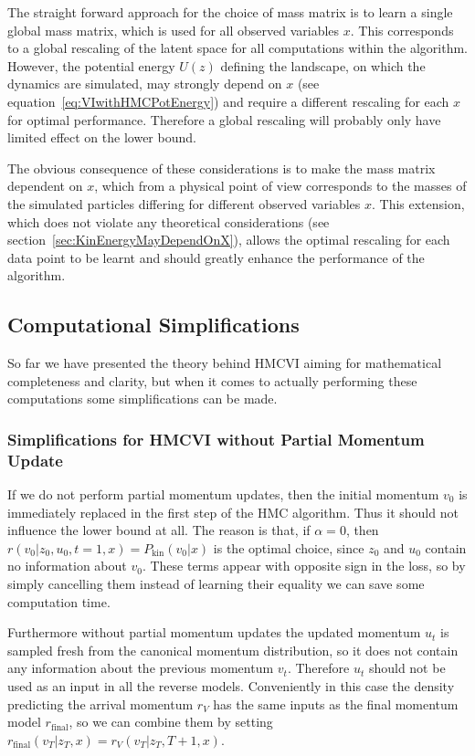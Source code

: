 The straight forward approach for the choice of mass matrix is to learn a single global mass matrix, which is used for all observed variables $x$. This corresponds to a global rescaling of the latent space for all computations within the algorithm. However, the potential energy $U(z)$ defining the landscape, on which the dynamics are simulated, may strongly depend on $x$ (see equation~\eqref{eq:VIwithHMCPotEnergy}) and require a different rescaling for each $x$ for optimal performance. Therefore a global rescaling will probably only have limited effect on the lower bound.

The obvious consequence of these considerations is to make the mass matrix dependent on $x$, which from a physical point of view corresponds to the masses of the simulated particles differing for different observed variables $x$. This extension, which does not violate any theoretical considerations (see section~\ref{sec:KinEnergyMayDependOnX}), allows the optimal rescaling for each data point to be learnt and should greatly enhance the performance of the algorithm.

\subsection{Computational Simplifications}

So far we have presented the theory behind HMCVI aiming for mathematical completeness and clarity, but when it comes to actually performing these computations some simplifications can be made.

\subsubsection{Simplifications for HMCVI without Partial Momentum Update}
\label{sec:SimplificationWithoutPartialMomentumUpdate}
If we do not perform partial momentum updates, then the initial momentum $v_0$ is immediately replaced in the first step of the HMC algorithm. Thus it should not influence the lower bound at all. The reason is that, if $\alpha = 0$, then $r(v_0|z_0, u_0, t=1, x) = P_\textrm{kin}(v_0|x)$ is the optimal choice, since $z_0$ and $u_0$ contain no information about $v_0$. These terms appear with opposite sign in the loss, so by simply cancelling them instead of learning their equality we can save some computation time.

Furthermore without partial momentum updates the updated momentum $u_t$ is sampled fresh from the canonical momentum distribution, so it does not contain any information about the previous momentum $v_t$. Therefore $u_t$ should not be used as an input in all the reverse models. Conveniently in this case the density predicting the arrival momentum $r_V$ has the same inputs as the final momentum model $r_\textrm{final}$, so we can combine them by setting $r_\textrm{final}(v_T | z_T, x) = r_V(v_T | z_T, T+1, x)$.

